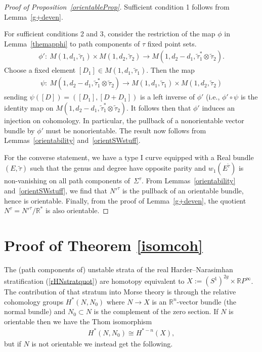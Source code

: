 \documentclass[10pt,a4paper]{amsart}
\numberwithin{equation}{section}
\begin{document}
\begin{proof}[Proof of Proposition~\ref{orientableProp}]
Suf\/f\/icient condition 1 follows from Lemma~\ref{g+deven}.

For suf\/f\/icient conditions 2 and 3, consider the restriction of the map $\phi$ in Lemma~\ref{themapphi} to path components of $\tau$ f\/ixed point sets.
\begin{gather*} \phi'\colon \ M(1,d_1, \tilde{\tau}_1) \times M(1,d_2,\tilde{\tau}_2) \rightarrow M(1,d_2-d_1, \tilde{\tau}_1^* \otimes \tilde{\tau}_2).\end{gather*}
Choose a f\/ixed element $[D_1] \in M(1,d_1, \tilde{\tau}_1)$. Then the map
\begin{gather*}\psi\colon \ M(1,d_2-d_1, \tilde{\tau}_1^* \otimes \tilde{\tau}_2) \rightarrow M(1,d_1, \tilde{\tau}_1) \times M(1,d_2,\tilde{\tau}_2)\end{gather*}
sending $\psi( [D]) = ( [D_1], [D +D_1])$ is a left inverse of $\phi'$ (i.e., $\phi' \circ \psi$ is the identity map on $M(1,d_2-d_1, \tilde{\tau}_1^* \otimes \tilde{\tau}_2 )$. It follows then that $\phi'$ induces an injection on cohomology. In particular, the pullback of a nonorientable vector bundle by $\phi'$ must be nonorientable. The result now follows from Lemmas~\ref{orientability} and~\ref{orientSWstuff}.

For the converse statement, we have a type I curve equipped with a Real bundle $(E,\tilde{\tau})$ such that the genus and degree have opposite parity and $w_1(E^{\tilde{\tau}})$ is non-vanishing on all path components of~$\Sigma^{\tau}$. From Lemmas~\ref{orientability} and~\ref{orientSWstuff}, we f\/ind that $N'^{\tau}$ is the pullback of an orientable bundle, hence is orientable. Finally, from the proof of Lemma~\ref{g+deven}, the quotient $N^{\tau} = N'^{\tau}/{\mathbb R}^*$ is also orientable.
\end{proof}

\section{Proof of Theorem \ref{isomcoh}}

The (path components of) unstable strata of the real Harder--Narasimhan stratif\/ication (\ref{rHNstratquot}) are homotopy equivalent to $X := (S^1)^{2g} \times {\mathbb R} P^{\infty} $. The contribution of that stratum into Morse theory is through the relative cohomology groups $H^*(N, N_0)$ where $N \rightarrow X$ is an ${\mathbb R}^n$-vector bundle (the normal bundle) and $N_0 \subset N$ is the complement of the zero section. If $N$ is orientable then we have the Thom isomorphism \begin{gather*}H^*(N, N_0) \cong H^{*-n}(X),\end{gather*}
but if $N$ is not orientable we instead get the following.
\end{document}
